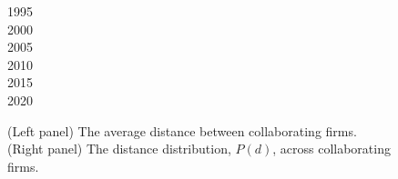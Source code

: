 \begin{figure}[tbp]
\begin{minipage}{0.05\linewidth}
\colorbox{col6!50}{1995} \\
\colorbox{col11!50}{2000} \\
\colorbox{col16!50}{2005} \\
\colorbox{col21!50}{2010} \\
\colorbox{col26!50}{2015} \\
\colorbox{col31!50}{2020} \\
\end{minipage}
\caption{(Left panel) The average distance between collaborating firms. (Right panel) The distance distribution, $P(d)$, across
collaborating firms.}
\label{fig:dist-mean-distribution}
\end{figure}



